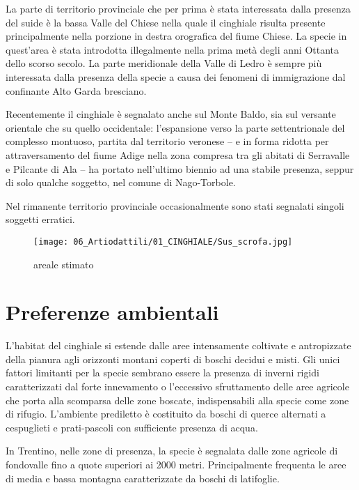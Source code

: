 \begin{multicols}{2}
La parte di territorio provinciale che per prima \`e stata interessata
dalla presenza del suide \`e la bassa Valle del Chiese nella quale il
cinghiale risulta presente principalmente nella porzione in destra
orografica del fiume Chiese. La specie in quest{\textquoteright}area
\`e stata introdotta illegalmente nella prima met\`a degli anni Ottanta
dello scorso secolo. La parte meridionale della Valle di Ledro \`e
sempre pi\`u interessata dalla presenza della specie a causa dei
fenomeni di immigrazione dal confinante Alto Garda bresciano. 

Recentemente il cinghiale \`e segnalato anche sul Monte Baldo, sia sul
versante orientale che su quello occidentale:
l{\textquoteright}espansione verso la parte settentrionale del
complesso montuoso, partita dal territorio veronese -- e in forma
ridotta per attraversamento del fiume Adige nella zona compresa tra gli
abitati di Serravalle e Pilcante di Ala -- ha portato
nell{\textquoteright}ultimo biennio ad una stabile presenza, seppur di
solo qualche soggetto, nel comune di Nago-Torbole.

Nel rimanente territorio provinciale occasionalmente sono stati
segnalati singoli soggetti erratici. 

\begin{figure*}
	\centering
	\texttt{[image: 06\_Artiodattili/01\_CINGHIALE/Sus\_scrofa.jpg]}
	\caption*{\tikzcircle[red,fill=red]{3pt} areale stimato}
\end{figure*}

\section{Preferenze ambientali}L{\textquoteright}habitat del cinghiale
si estende dalle aree intensamente coltivate e antropizzate della
pianura agli orizzonti montani coperti di boschi decidui e misti. Gli
unici fattori limitanti per la specie sembrano essere la presenza di
inverni rigidi caratterizzati dal forte innevamento o
l{\textquoteright}eccessivo sfruttamento delle aree agricole che porta
alla scomparsa delle zone boscate, indispensabili alla specie come zone
di rifugio. L{\textquoteright}ambiente prediletto \`e costituito da
boschi di querce alternati a cespuglieti e prati-pascoli con
sufficiente presenza di acqua. 

In Trentino, nelle zone di presenza, la specie \`e segnalata dalle zone
agricole di fondovalle fino a quote superiori ai 2000 metri.
Principalmente frequenta le aree di media e bassa montagna
caratterizzate da boschi di latifoglie. 


\end{multicols}
